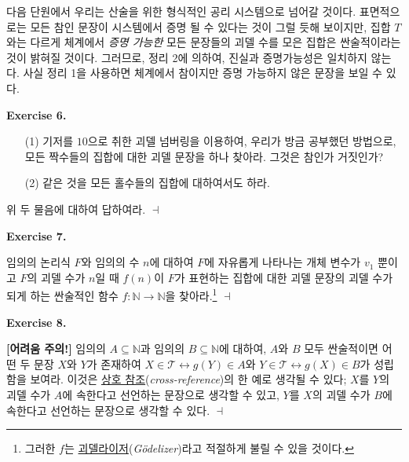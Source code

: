 \documentclass[12pt]{paper}
\newenvironment{context}[1][]
{ \noindent \textbf{{#1}.}
}
{ \hfill $ \dashv $
}
\begin{document}
  다음 단원에서 우리는 산술을 위한 형식적인 공리 시스템으로 넘어갈 것이다.
  표면적으로는 모든 참인 문장이 시스템에서 증명 될 수 있다는 것이 그럴 듯해 보이지만,
  집합 $T$와는 다르게 체계에서 \textit{증명 가능한} 모든 문장들의 괴델 수를 모은 집합은 싼술적이라는 것이 밝혀질 것이다.
  그러므로, 정리 2에 의하여, 진실과 증명가능성은 일치하지 않는다.
  사실 정리 1을 사용하면 체계에서 참이지만 증명 가능하지 않은 문장을 보일 수 있다.

  \begin{context}[Exercise 6]
    \begin{enumerate}
      \item[(1)] 기저를 $10$으로 취한 괴델 넘버링을 이용하여, 우리가 방금 공부했던 방법으로, 모든 짝수들의 집합에 대한 괴델 문장을 하나 찾아라.
      그것은 참인가 거짓인가?
      \item[(2)] 같은 것을 모든 홀수들의 집합에 대하여서도 하라.
    \end{enumerate}
    
    위 두 물음에 대하여 답하여라.
  \end{context}

  \begin{context}[Exercise 7]
    임의의 논리식 $F$와 임의의 수 $n$에 대하여 $F$에 자유롭게 나타나는 개체 변수가 $v_1$ 뿐이고 $F$의 괴델 수가 $n$일 때 $f \left( n \right)$이 $F$가 표현하는 집합에 대한 괴델 문장의 괴델 수가 되게 하는 싼술적인 함수 $f : \mathbb{N} \to \mathbb{N}$을 찾아라.\footnote
    {
      그러한 $f$는 \underline{괴델라이저}(\textit{G\"odelizer})라고 적절하게 불릴 수 있을 것이다.
    }
  \end{context}

  \begin{context}[Exercise 8]
    \textbf{[어려움 주의!]} 임의의 $A \subseteq \mathbb{N}$과 임의의 $B \subseteq \mathbb{N}$에 대하여,
    $A$와 $B$ 모두 싼술적이면 어떤 두 문장 $X$와 $Y$가 존재하여 $X \in \mathcal{T} \leftrightarrow g \left( Y \right) \in A$와 $Y \in \mathcal{T} \leftrightarrow g \left( X \right) \in B$가 성립함을 보여라.
    이것은 \underline{상호 참조}(\textit{cross-reference})의 한 예로 생각될 수 있다;
    $X$를 $Y$의 괴델 수가 $A$에 속한다고 선언하는 문장으로 생각할 수 있고,
    $Y$를 $X$의 괴델 수가 $B$에 속한다고 선언하는 문장으로 생각할 수 있다.
  \end{context}
\end{document}
